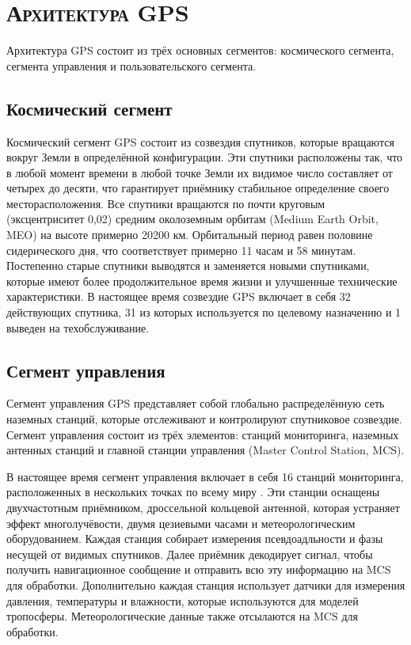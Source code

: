 \section{\textsc{Архитектура GPS}}

Архитектура GPS состоит из трёх основных сегментов: космического сегмента, сегмента управления и пользовательского сегмента.

\subsection*{\textbf{Космический сегмент}}

Космический сегмент GPS состоит из созвездия спутников, которые вращаются вокруг Земли в определённой конфигурации.
Эти спутники расположены так, что в любой момент времени в любой точке Земли их видимое число составляет от четырех до десяти, что гарантирует приёмнику стабильное определение своего месторасположения.  
Все спутники вращаются по почти круговым (эксцентриситет 0,02) средним околоземным орбитам (Medium Earth Orbit, MEO) на высоте примерно 20200 км. 
Орбитальный период равен половине сидерического дня, что соответствует примерно 11 часам и 58 минутам.  
Постепенно старые спутники выводятся и заменяется новыми спутниками, которые имеют более продолжительное время жизни и улучшенные технические характеристики. 
В настоящее время созвездие GPS включает в себя 32 действующих спутника, 31 из которых используется по целевому назначению и 1 выведен на техобслуживание. 

\subsection*{\textbf{Сегмент управления}}

Сегмент управления GPS представляет собой глобально распределённую сеть наземных станций, которые отслеживают и контролируют спутниковое созвездие.
Сегмент управления состоит из трёх элементов: станций мониторинга, наземных антенных станций и главной станции управления (Master Control Station, MCS).

В настоящее время сегмент управления включает в себя 16 станций мониторинга, расположенных в нескольких точках по всему миру \cite{GPS}.
Эти станции оснащены двухчастотным приёмником, дроссельной кольцевой антенной, которая устраняет эффект многолучёвости, двумя цезиевыми часами и метеорологическим оборудованием.      
Каждая станция собирает измерения псевдоадльности и фазы несущей от видимых спутников.   
Далее приёмник декодирует сигнал, чтобы получить навигационное сообщение и отправить всю эту информацию на MCS для обработки. 
Дополнительно каждая станция использует датчики для измерения давления, температуры и влажности, которые используются для моделей тропосферы.
Метеорологические данные также отсылаются на MCS для обработки.  

